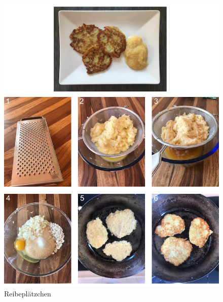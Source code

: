 \begin{figure}[!htb]
    \begin{center}
    \includegraphics[width=16cm]{Pictures/Main/Reibeplaetzchen/reibeplaetzchen.jpg}
    \caption[Reibeplätzchen]{Reibeplätzchen}
    \label{fig:reibeplaetzchen}
    \end{center}
\end{figure}